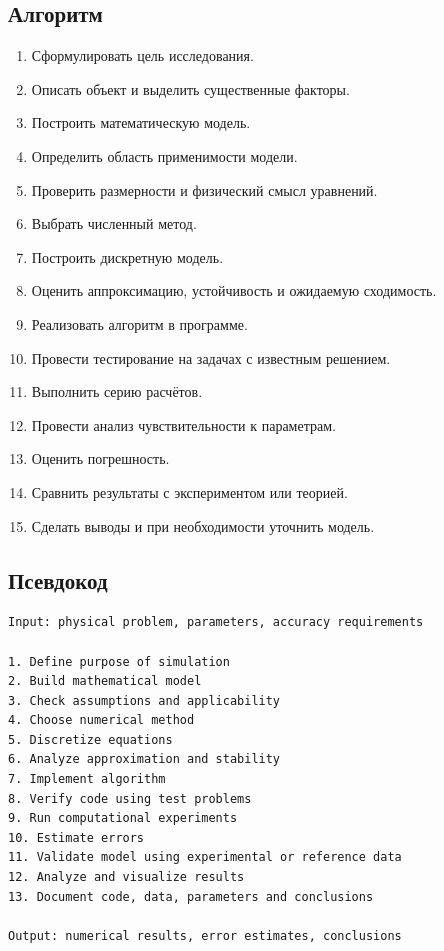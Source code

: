 \documentclass[12pt,a4paper]{article}
\theoremstyle{definition}
\theoremstyle{plain}
\begin{document}
\subsection{Алгоритм}

\begin{enumerate}
    \item Сформулировать цель исследования.
    \item Описать объект и выделить существенные факторы.
    \item Построить математическую модель.
    \item Определить область применимости модели.
    \item Проверить размерности и физический смысл уравнений.
    \item Выбрать численный метод.
    \item Построить дискретную модель.
    \item Оценить аппроксимацию, устойчивость и ожидаемую сходимость.
    \item Реализовать алгоритм в программе.
    \item Провести тестирование на задачах с известным решением.
    \item Выполнить серию расчётов.
    \item Провести анализ чувствительности к параметрам.
    \item Оценить погрешность.
    \item Сравнить результаты с экспериментом или теорией.
    \item Сделать выводы и при необходимости уточнить модель.
\end{enumerate}

\subsection{Псевдокод}

\begin{lstlisting}[style=pseudo]
Input: physical problem, parameters, accuracy requirements

1. Define purpose of simulation
2. Build mathematical model
3. Check assumptions and applicability
4. Choose numerical method
5. Discretize equations
6. Analyze approximation and stability
7. Implement algorithm
8. Verify code using test problems
9. Run computational experiments
10. Estimate errors
11. Validate model using experimental or reference data
12. Analyze and visualize results
13. Document code, data, parameters and conclusions

Output: numerical results, error estimates, conclusions
\end{lstlisting}
\end{document}
